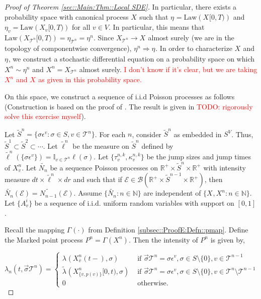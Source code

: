 \documentclass[12pt]{article}
\newcommand{\mb}{\mathbb}
\newcommand{\mc}{\mathcal}
\newcommand{\ms}{\mathscr}
\newcommand{\ra}{\rightarrow}
\newcommand{\ov}{\overline}
\newcommand{\te}{\text}
\newcommand{\ep}{\epsilon}
\newcommand{\tr}{\textcolor{red}}
\newcommand{\ind}{\hspace{24pt}}
\renewcommand{\v}{v}							%
\renewcommand{\S}{S}							%
\newcommand{\s}{\sigma}							%
\newcommand{\sv}{\vec{\s}}						%
\newcommand{\ev}[1]{\ep^{#1}}					%
\newcommand{\T}{T}								%
\renewcommand{\t}{t}							%
\newcommand{\cl}{\ov}							%
\newcommand{\poiss}[1]{N_{#1}}						%
\newcommand{\law}{\te{Law}}							%
\newcommand{\pup}[1]{^{#1}}							%
\newcommand{\tree}{\mc{T}}							%
\newcommand{\V}{V}									%
\renewcommand{\r}{r}								%
\newcommand{\rt}[1]{\tau^{#1}}						%
\renewcommand{\it}{k}								%
\newcommand{\itt}{i}								%
\newcommand{\numb}{n}								%
\newcommand{\XState}[1]{\S^{#1}}				%
\newcommand{\rxvtn}[3]{X_{#1}^{#3}(#2)}				%
\newcommand{\rxvts}[2]{X_{#1}{#2}}					%
\newcommand{\rxvtsn}[3]{X_{#1}^{#3}{#2}}			%
\newcommand{\rp}[1]{P^{#1}}							%
\newcommand{\mmm}[3]{\eta_{#2#1}^{#3}}						%
\newcommand{\rate}[1]{\lambda_{#1}}					%
\newcommand{\crate}[2]{\alt{\lambda}_{#1}^{#2}}		%
\newcommand{\Sm}{\ell}								%
\newcommand{\alt}{\widetilde}						%
\newcommand{\rv}{A}								%
\newcommand{\evnt}{\mc{E}}						%
\renewcommand{\mark}[1]{\kappa^{#1}}				%
\newcommand{\p}[1]{p(#1)}						%
\newcommand{\pmap}[1]{\Gamma_{#1}}				%
\begin{document}
\begin{proof}[Proof of Theorem \ref{sec::Main:Thm::Local SDE}]
\ind In particular, there exists a probability space with canonical process \(\rxvts{}{}\) such that \(\mmm{}{}{} = \law(\rxvts{}{[0,\T)})\) and \(\mmm{\v}{}{} = \law(\rxvts{\v}{[0,\T)})\) for all \(\v \in \V\). In particular, this means that \(\law(\rxvts{\tree\pup{\numb}}{[0,\T)}) = \mmm{\tree\pup{\numb}}{}{} = \mmm{}{}{\numb}\). Since \(\rxvts{\tree\pup{\numb}}{} \ra \rxvts{}{}\) almost surely (we are in the topology of componentwise convergence), \(\mmm{}{}{\numb} \Rightarrow \mmm{}{}{}\). In order to characterize \(\rxvts{}{}\) and \(\mmm{}{}{}\), we construct a stochastic differential equation on a probability space on which \(\rxvtsn{}{}{\numb} \sim \mmm{}{}{\numb}\) and \(\rxvtsn{}{}{\numb} = \rxvts{\tree\pup{\numb}}{}\) almost surely. \tr{I don't know if it's clear, but we are taking \(\rxvtsn{}{}{\numb}\) and \(\rxvts{}{}\) as given in this probability space.}

\ind On this space, we construct a sequence of i.i.d Poisson processes as follows (Construction is based on the proof of \cite[Theorem 14.7.1(b)]{DalVer08}. The result is given in \cite[Exercise 14.7.1]{DalVer08} \tr{TODO: rigorously solve this exercise myself}).

\ind Let \(\alt{\S}^\numb = \{\s\ev{\v}: \s\in\S,\v \in \tree\pup{\numb}\}\). For each \(\numb\), consider \(\alt{\S}^\numb\) as embedded in \(\S^\V\). Thus, \(\alt{\S}^1 \subset \alt{\S}^2 \subset \cdots\). Let \(\alt{\Sm}\pup{\numb}\) be the measure on \(\alt{\S}^\numb\) defined by \(\alt{\Sm}\pup{\numb}(\{\s\ev{\v}\}) = \mb{I}_{\v \in \tree\pup{\numb}}\Sm(\s)\). Let \(\{\rt{\numb,\it}_\v,\mark{\numb,\it}_{\v}\}\) be the jump sizes and jump times of \(\rxvtsn{\v}{}{\numb}\). Let \(\alt{\poiss{\numb}}\) be a sequence Poisson processes on \(\mb{R}^+\times\alt{S}^\numb\times \mb{R}^+\) with intensity measure \(d\t\times\alt{\Sm}^\numb\times d\r\) and such that if \(\evnt \in \ms{B}(\mb{R}^+\times\alt{S}^{\numb-1}\times \mb{R}^+)\), then \(\alt{\poiss{\numb}}(\evnt) = \alt{\poiss{\numb-1}}(\evnt)\). Assume \(\{\alt{\poiss{\numb}}:\numb\in\mb{N}\}\) are independent of \(\{\rxvts{}{},\rxvtsn{}{}{\numb}:\numb\in\mb{N}\}\). Let \(\{\rv_{\v}^{\itt}\}\) be a sequence of i.i.d. uniform random variables with support on \([0,1]\).

\ind Recall the mapping \(\pmap{}(\cdot)\) from Definition \ref{subsec::ProofE:Defn::pmap}. Define the Marked point process \(\rp{\numb} = \pmap{}(\rxvtsn{}{}{\numb})\). Then the intensity of \(\rp{\numb}\) is given by,

\[\rate{\numb}(\t,\sv{\tree\pup{\numb}}) = \begin{cases}
\rate{}(\rxvtn{\cl{\v}}{\t-}{\numb},\s) &\te{ if } \sv{\tree\pup{\numb}} = \s\ev{\v},\s \in \S\setminus\{0\},\v\in\tree\pup{\numb-1}\\
\crate{}{}(\rxvtsn{\{\v,\p{\v}\}}{[0,\t)}{\numb},\s) &\te{ if } \sv{\tree\pup{\numb}} = \s\ev{\v},\s\in\S\setminus\{0\},\v\in\tree\pup{\numb}\setminus\tree\pup{\numb-1}\\
0 &\te{ otherwise.}
\end{cases}\]


\end{proof}
\end{document}
